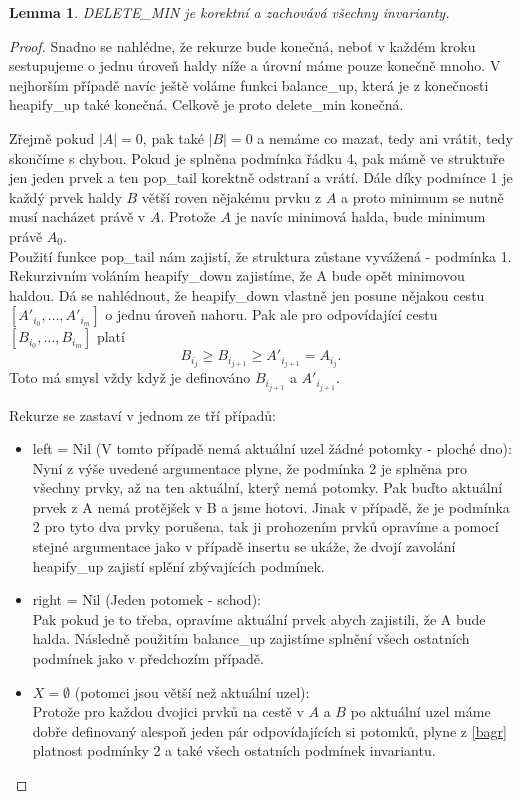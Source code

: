 \documentclass[12pt,a4paper]{article}
\theoremstyle{plain}
\newtheorem{lemma}[thm]{Lemma}
\begin{document}
\begin{lemma} DELETE\_MIN je korektní a zachovává všechny invarianty.
\end{lemma}
\begin{proof}
Snadno se nahlédne, že rekurze bude konečná, neboť v každém kroku sestupujeme o jednu úroveň haldy níže a úrovní máme pouze konečně mnoho. V nejhorším případě navíc ještě voláme funkci balance\_up, která je z konečnosti heapify\_up také konečná. Celkově je proto delete\_min konečná.

Zřejmě pokud $ |A| = 0 $, pak také $ |B| = 0 $ a nemáme co mazat, tedy ani vrátit,
tedy skončíme s chybou. Pokud je splněna podmínka řádku 4, pak mámě ve struktuře
jen jeden prvek a ten pop\_tail korektně odstraní a vrátí. Dále díky podmínce 1 je
každý prvek haldy $B $ větší roven nějakému prvku z $ A $ a proto minimum se nutně musí nacházet právě v $ A $. Protože $ A $ je navíc minimová halda, bude minimum právě $ A_0 $. \\

Použití funkce pop\_tail nám zajistí, že struktura zůstane vyvážená - podmínka 1. Rekurzivním voláním heapify\_down zajistíme, že A bude opět minimovou haldou.
Dá se nahlédnout, že heapify\_down vlastně jen
posune nějakou cestu $[A'_{i_0}, \dots, A'_{i_m}]$ o jednu úroveň nahoru. Pak ale pro odpovídající cestu $[B_{i_0}, \dots, B_{i_m}]$ platí 
\begin{equation}\label{bagr}
 B_{i_j} \geq B_{i_{j+1}} \geq A'_{i_{j + 1}} = A_{i_j}.
\end{equation}
Toto má smysl vždy když je definováno $ B_{i_{j+1}} $ a $ A'_{i_{j + 1}} $. 

Rekurze se zastaví v jednom ze tří případů:
\begin{itemize}
\item left = Nil (V tomto případě nemá aktuální uzel žádné potomky - ploché dno):  \\
Nyní z výše uvedené argumentace plyne, že podmínka 2 je splněna pro všechny prvky, až na ten aktuální, který nemá potomky. Pak buďto aktuální prvek z A nemá protějšek v B a jsme hotovi. Jinak v případě, že je podmínka 2 pro tyto dva prvky porušena, tak ji prohozením prvků opravíme a pomocí stejné argumentace jako v případě insertu se ukáže, že dvojí zavolání heapify\_up zajistí splění zbývajících podmínek.
\item right = Nil (Jeden potomek - schod):  \\
Pak pokud je to třeba, opravíme aktuální prvek abych zajistili, že A bude halda. Následně použitím balance\_up zajistíme splnění všech ostatních podmínek jako v předchozím případě.
\item $ X = \emptyset $ (potomci jsou větší než aktuální uzel): \\
Protože pro každou dvojici prvků na cestě v $ A $ a $ B $ po aktuální uzel máme dobře definovaný alespoň jeden pár odpovídajících si potomků, plyne z \eqref{bagr} platnost podmínky 2 a také všech ostatních podmínek invariantu. 

\end{itemize}
\end{proof}
\end{document}
